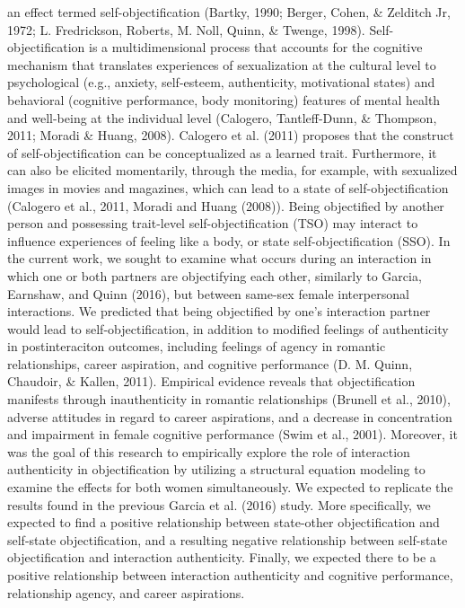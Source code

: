 \documentclass[man]{apa6}
\begin{document}
an effect termed self-objectification (Bartky, 1990; Berger, Cohen, \&
Zelditch Jr, 1972; L. Fredrickson, Roberts, M. Noll, Quinn, \& Twenge,
1998). Self-objectification is a multidimensional process that accounts
for the cognitive mechanism that translates experiences of sexualization
at the cultural level to psychological (e.g., anxiety, self-esteem,
authenticity, motivational states) and behavioral (cognitive
performance, body monitoring) features of mental health and well-being
at the individual level (Calogero, Tantleff-Dunn, \& Thompson, 2011;
Moradi \& Huang, 2008). Calogero et al. (2011) proposes that the
construct of self-objectification can be conceptualized as a learned
trait. Furthermore, it can also be elicited momentarily, through the
media, for example, with sexualized images in movies and magazines,
which can lead to a state of self-objectification (Calogero et al.,
2011, Moradi and Huang (2008)). Being objectified by another person and
possessing trait-level self-objectification (TSO) may interact to
influence experiences of feeling like a body, or state
self-objectification (SSO). In the current work, we sought to examine
what occurs during an interaction in which one or both partners are
objectifying each other, similarly to Garcia, Earnshaw, and Quinn
(2016), but between same-sex female interpersonal interactions. We
predicted that being objectified by one's interaction partner would lead
to self-objectification, in addition to modified feelings of
authenticity in postinteraciton outcomes, including feelings of agency
in romantic relationships, career aspiration, and cognitive performance
(D. M. Quinn, Chaudoir, \& Kallen, 2011). Empirical evidence reveals
that objectification manifests through inauthenticity in romantic
relationships (Brunell et al., 2010), adverse attitudes in regard to
career aspirations, and a decrease in concentration and impairment in
female cognitive performance (Swim et al., 2001). Moreover, it was the
goal of this research to empirically explore the role of interaction
authenticity in objectification by utilizing a structural equation
modeling to examine the effects for both women simultaneously. We
expected to replicate the results found in the previous Garcia et al.
(2016) study. More specifically, we expected to find a positive
relationship between state-other objectification and self-state
objectification, and a resulting negative relationship between
self-state objectification and interaction authenticity. Finally, we
expected there to be a positive relationship between interaction
authenticity and cognitive performance, relationship agency, and career
aspirations.
\end{document}
